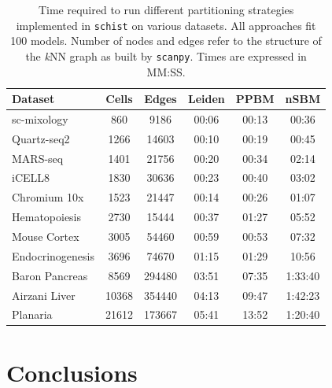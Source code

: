 \documentclass[10pt]{article}
\begin{document}
\begin{table}[h!]
\centering
 \begin{tabular}{|| l c c | c c c ||}
 \hline
 \textbf{Dataset} & \textbf{Cells} & \textbf{Edges} & \textbf{Leiden} & \textbf{PPBM} & \textbf{nSBM} \\ [0.5ex] 
 \hline\hline
 sc-mixology \cite{Tian_2019} & 860 & 9186 & 00:06 & 00:13 & 00:36 \\ 
 \hline
 Quartz-seq2 \cite{mereu_2020} & 1266 & 14603 & 00:10 & 00:19 & 00:45 \\
 \hline
 MARS-seq \cite{mereu_2020} & 1401 & 21756 & 00:20 & 00:34 & 02:14 \\
 \hline
 iCELL8 \cite{mereu_2020} & 1830 & 30636 & 00:23 & 00:40 & 03:02 \\
 \hline
 Chromium 10x \cite{mereu_2020} & 1523 & 21447 & 00:14 & 00:26 & 01:07 \\ 
 \hline
 Hematopoiesis \cite{paul_2015} & 2730 & 15444 & 00:37 & 01:27 & 05:52\\ 
 \hline
 Mouse Cortex \cite{Zeisel_2015} & 3005 & 54460 & 00:59 & 00:53 & 07:32 \\
 \hline
 Endocrinogenesis \cite{Bastidas_Ponce_2019} & 3696 & 74670 & 01:15 & 01:29 & 10:56 \\
 \hline
 Baron Pancreas \cite{Baron_2016} & 8569 & 294480 & 03:51 & 07:35 & 1:33:40 \\
 \hline
 Airzani Liver \cite{Aizarani_2019} & 10368 & 354440 & 04:13 & 09:47 & 1:42:23 \\
 \hline
 Planaria \cite{plass_2018} & 21612 & 173667 & 05:41 & 13:52 & 1:20:40 \\
 \hline
\end{tabular}
\caption{Time required to run different partitioning strategies implemented in \texttt{schist} on various datasets. All approaches fit 100 models. Number of nodes and edges refer to the structure of the \emph{k}NN graph as built by \texttt{scanpy}. Times are expressed in MM:SS. }
\label{Table_runtime}
\end{table}

\section*{Conclusions}
\end{document}
